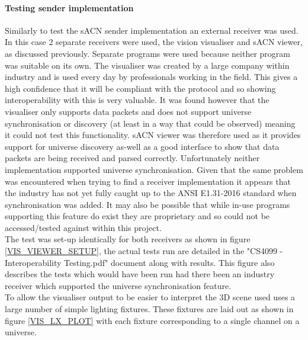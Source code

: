 \documentclass[11pt,a4paper]{report}
\begin{document}
\paragraph*{Testing sender implementation}
Similarly to test the sACN sender implementation an external receiver was used. In this case 2 separate receivers were used, the vision visualiser and sACN viewer, as discussed previously. Separate programs were used because neither program was suitable on its own. The visualiser was created by a large company within industry and is used every day by professionals working in the field. This gives a high confidence that it will be compliant with the protocol and so showing interoperability with this is very valuable. It was found however that the visualiser only supports data packets and does not support universe synchronisation or discovery (at least in a way that could be observed) meaning it could not test this functionality. sACN viewer was therefore used as it provides support for universe discovery as-well as a good interface to show that data packets are being received and parsed correctly. Unfortunately neither implementation supported universe synchronisation. Given that the same problem was encountered when trying to find a receiver implementation it appears that the industry has not yet fully caught up to the ANSI E1.31-2016 standard when synchronisation was added. It may also be possible that while in-use programs supporting this feature do exist they are proprietary and so could not be accessed/tested against within this project. \\

The test was set-up identically for both receivers as shown in figure \ref{VIS_VIEWER_SETUP}, the actual tests run are detailed in the "CS4099 - Interoperability Testing.pdf" document along with results. This figure also describes the tests which would have been run had there been an industry receiver which supported the universe synchronisation feature.\\

To allow the visualiser output to be easier to interpret the 3D scene used uses a large number of simple lighting fixtures. These fixtures are laid out as shown in figure \ref{VIS_LX_PLOT} with each fixture corresponding to a single channel on a universe.\\
\end{document}
